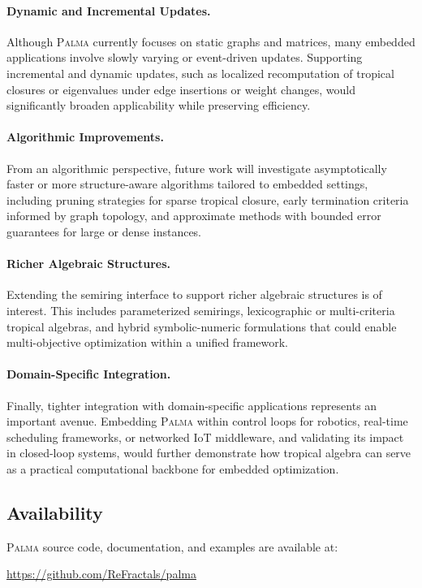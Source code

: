 \documentclass[11pt,a4paper]{article}
\theoremstyle{plain}
\theoremstyle{definition}
\newcommand{\palma}{\textsc{Palma}}
\begin{document}
\paragraph{Dynamic and Incremental Updates.}
Although \palma{} currently focuses on static graphs and matrices, many embedded applications involve slowly varying or event-driven updates. Supporting incremental and dynamic updates, such as localized recomputation of tropical closures or eigenvalues under edge insertions or weight changes, would significantly broaden applicability while preserving efficiency.

\paragraph{Algorithmic Improvements.}
From an algorithmic perspective, future work will investigate asymptotically faster or more structure-aware algorithms tailored to embedded settings, including pruning strategies for sparse tropical closure, early termination criteria informed by graph topology, and approximate methods with bounded error guarantees for large or dense instances.

\paragraph{Richer Algebraic Structures.}
Extending the semiring interface to support richer algebraic structures is of interest. This includes parameterized semirings, lexicographic or multi-criteria tropical algebras, and hybrid symbolic-numeric formulations that could enable multi-objective optimization within a unified framework.

\paragraph{Domain-Specific Integration.}
Finally, tighter integration with domain-specific applications represents an important avenue. Embedding \palma{} within control loops for robotics, real-time scheduling frameworks, or networked IoT middleware, and validating its impact in closed-loop systems, would further demonstrate how tropical algebra can serve as a practical computational backbone for embedded optimization.

\subsection{Availability}

\palma{} source code, documentation, and examples are available at:
\begin{center}
    \url{https://github.com/ReFractals/palma}
\end{center}
\end{document}
